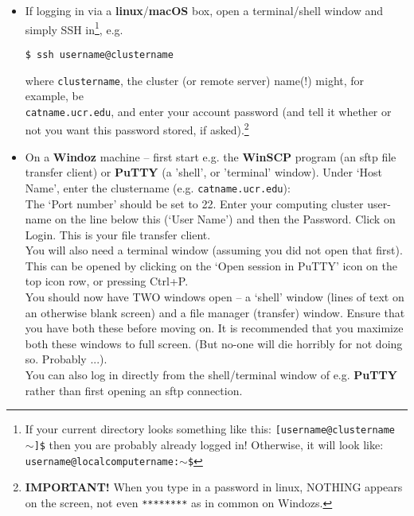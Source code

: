 \documentclass[11pt,fleqn]{book} %
\begin{document}
\begin{itemize}
\item If logging in via a \textbf{linux}/\textbf{macOS} box, open a terminal/shell window and simply SSH in\footnote{If your current directory looks something like this: \texttt{[username@clustername \(\sim\)]\$}
then you are probably already logged in! Otherwise, it will look like: \texttt{username@localcomputername:\(\sim\)\$}}, e.g.

\vspace{-1mm}
\begin{verbatim}
$ ssh username@clustername
\end{verbatim}
\vspace{-1mm}

where \texttt{clustername}, the cluster (or remote server) name(!) might, for example, be
\\  \texttt{catname.ucr.edu}, and enter your  account password (and tell it whether or not you want this password stored, if asked).\footnote{\textbf{IMPORTANT!}
 When you type in a password in linux, NOTHING appears on the screen, not even \texttt{********} as in common on Windozs.}

\item On a \textbf{Windoz} machine – first start e.g. the \textbf{WinSCP} program (an sftp file transfer client) or \textbf{PuTTY} (a 'shell', or 'terminal' window). Under ‘Host Name’, enter the clustername (e.g. \texttt{catname.ucr.edu}):
\\The ‘Port number’ should be set to 22. Enter your computing cluster user-name on the line below this (‘User Name’) and then the Password. Click on Login. This is your file transfer client.
\\You will also need a terminal window (assuming you did not open that first). This can be opened by clicking on the ‘\textsf{Open session in PuTTY}’ icon on the top icon row, or pressing \textsf{Ctrl+P}. \\You should now have TWO windows open – a ‘shell’ window (lines of text on an otherwise blank screen) and a file manager (transfer) window. Ensure that you have both these before moving on. It is recommended that you maximize both these windows to full screen. (But no-one will die horribly for not doing so. Probably ...).
\\ You can also log in directly from the shell/terminal window of e.g. \textbf{PuTTY} rather than first opening an sftp connection.
\end{itemize}
\end{document}
